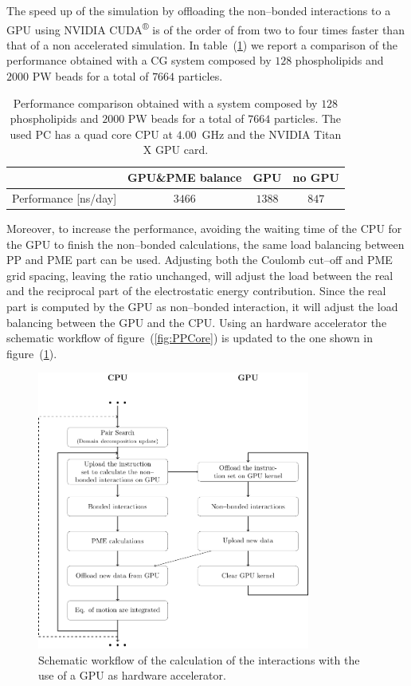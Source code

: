 The speed up of the simulation by offloading the non--bonded interactions to a GPU using NVIDIA 
CUDA\textsuperscript{®} is of the order of from two to four times faster than that of a non accelerated simulation. In table~(\ref{tab:performance}) we report a comparison of the performance obtained with a \ac{CG} system composed by $128$ phospholipids and $2000$ \ac{PW} beads for a total of $7664$ particles.
\begin{table}[ht]
	\centering
	\begin{tabular}{lccc}
		\toprule
		\, 					& GPU\&\acs{PME} balance 	& GPU		& no GPU	\\ \midrule
		Performance [ns/day]& $3466$					& $1388$	& $847$		\\ \bottomrule
	\end{tabular}
	\caption{Performance comparison obtained with a system composed by $128$ phospholipids and $2000$ \ac{PW} beads for a total of $7664$ particles. The used PC has a quad core CPU at $4.00$~GHz and the NVIDIA Titan X GPU card.}
	\label{tab:performance}
\end{table}
Moreover, to increase the performance, avoiding the waiting time of the CPU for the GPU to finish the non--bonded 
calculations, the same load balancing between \ac{PP} and \ac{PME} part can be used. Adjusting both the Coulomb 
cut--off and \ac{PME} grid spacing, leaving the ratio unchanged, will adjust the load between the real and the 
reciprocal part of the electrostatic energy contribution. Since the real part is computed by the GPU as 
non--bonded interaction, it will adjust the load balancing between the GPU and the CPU. Using an hardware 
accelerator the schematic workflow of figure~(\ref{fig:PPCore}) is updated to the one shown in 
figure~(\ref{fig:GPU}).
\begin{figure}[h!t]
	\centering
	\includegraphics[width=0.8\textwidth]{./img/Schemi/GPU}
	\caption{Schematic workflow of the calculation of the interactions with the use of a GPU as hardware accelerator.}
	\label{fig:GPU}
\end{figure}


